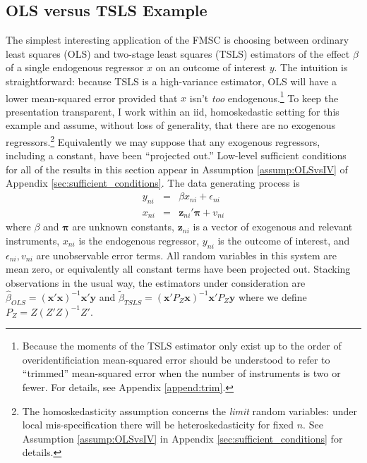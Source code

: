 \subsection{OLS versus TSLS Example}
\label{sec:OLSvsIVExample}
The simplest interesting application of the FMSC is choosing between ordinary least squares (OLS) and two-stage least squares (TSLS) estimators of the effect $\beta$ of a single endogenous regressor $x$ on an outcome of interest $y$.
The intuition is straightforward: because TSLS is a high-variance estimator, OLS will have a lower mean-squared error provided that $x$ isn't \emph{too} endogenous.\footnote{Because the moments of the TSLS estimator only exist up to the order of overidentificiation \citep{Phillips1980} mean-squared error should be understood to refer to ``trimmed'' mean-squared error when the number of instruments is two or fewer. For details, see Appendix \ref{append:trim}.}
To keep the presentation transparent, I work within an iid, homoskedastic setting for this example and assume, without loss of generality, that there are no exogenous regressors.\footnote{The homoskedasticity assumption concerns the \emph{limit} random variables: under local mis-specification there will be heteroskedasticity for fixed $n$. See Assumption \ref{assump:OLSvsIV} in Appendix \ref{sec:sufficient_conditions} for details.}
Equivalently we may suppose that any exogenous regressors, including a constant, have been ``projected out.''
Low-level sufficient conditions for all of the results in this section appear in Assumption \ref{assump:OLSvsIV} of Appendix \ref{sec:sufficient_conditions}.
The data generating process is
    \begin{eqnarray}
			y_{ni} &=& \beta x_{ni}  + \epsilon_{ni}\\
	x_{ni} &=& \mathbf{z}_{ni}' \boldsymbol{\pi} + v_{ni}
	\end{eqnarray}
where $\beta$ and $\boldsymbol{\pi}$ are unknown constants, $\mathbf{z}_{ni}$ is a vector of exogenous and relevant instruments, $x_{ni}$ is the endogenous regressor, $y_{ni}$ is the outcome of interest, and $\epsilon_{ni}, v_{ni}$ are unobservable error terms.
All random variables in this system are mean zero, or equivalently all constant terms have been projected out. 
Stacking observations in the usual way, the estimators under consideration are $\widehat{\beta}_{OLS} = \left(\mathbf{x}'\mathbf{x}\right)^{-1}\mathbf{x}'\mathbf{y}$ and
$\widetilde{\beta}_{TSLS} = \left(\mathbf{x}'P_Z\mathbf{x}\right)^{-1}\mathbf{x}'P_Z\mathbf{y}$ where we define $P_Z = Z(Z'Z)^{-1}Z'$. 

